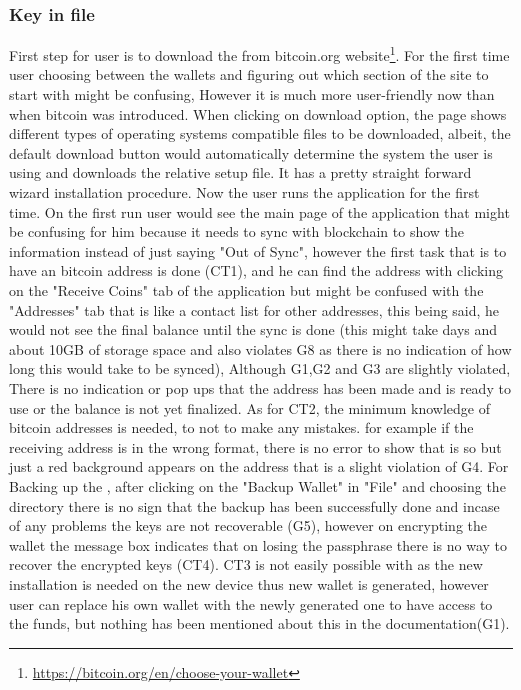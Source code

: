 \subsubsection{Key in file}
First step for user is to download the \bitcoinclient from bitcoin.org website\footnote{\url{https://bitcoin.org/en/choose-your-wallet}}. For the first time user choosing between the wallets and figuring out which section of the site to start  with might be confusing, However it is much more user-friendly now than when bitcoin was introduced. When clicking on \bitcoinclient download option, the page shows different types of operating systems compatible files to be downloaded, albeit, the default download button would automatically determine the system the user is using and downloads the relative setup file. It has a pretty straight forward wizard installation procedure. Now the user runs the application for the first time. On the first run user would see the main page of the application that might be confusing for him because it needs to sync with blockchain to show the information instead of just saying "Out of Sync", however the first task that is to have an bitcoin address is done (CT1), and he can find the address with clicking on the "Receive Coins" tab of the application but might be confused with the "Addresses" tab that is like a contact list for other addresses, this being said, he would not see the final balance until the sync is done (this might take days and about 10GB of storage space and also violates G8 as there is no indication of how long this would take to be synced), Although G1,G2 and G3 are slightly violated, There is no indication or pop ups that the address has been made and is ready to use or the balance is not yet finalized. As for CT2, the minimum knowledge of bitcoin addresses is needed, to not to make any mistakes. for example if the receiving address is in the wrong format, there is no error to show that is so but just a red background appears on the address that is a slight violation of G4. For Backing up the \walletfile, after clicking on the "Backup Wallet" in "File" and choosing the directory there is no sign that the backup has been successfully done and incase of any problems the keys are not recoverable (G5), however on encrypting the wallet the message box indicates that on losing the passphrase there is no way to recover the encrypted keys (CT4). CT3 is not easily possible with \bitcoinclient as the new installation is needed on the new device thus new wallet is generated, however user can replace his own wallet with the newly generated one to have access to the funds, but nothing has been mentioned about this in the documentation(G1). 


